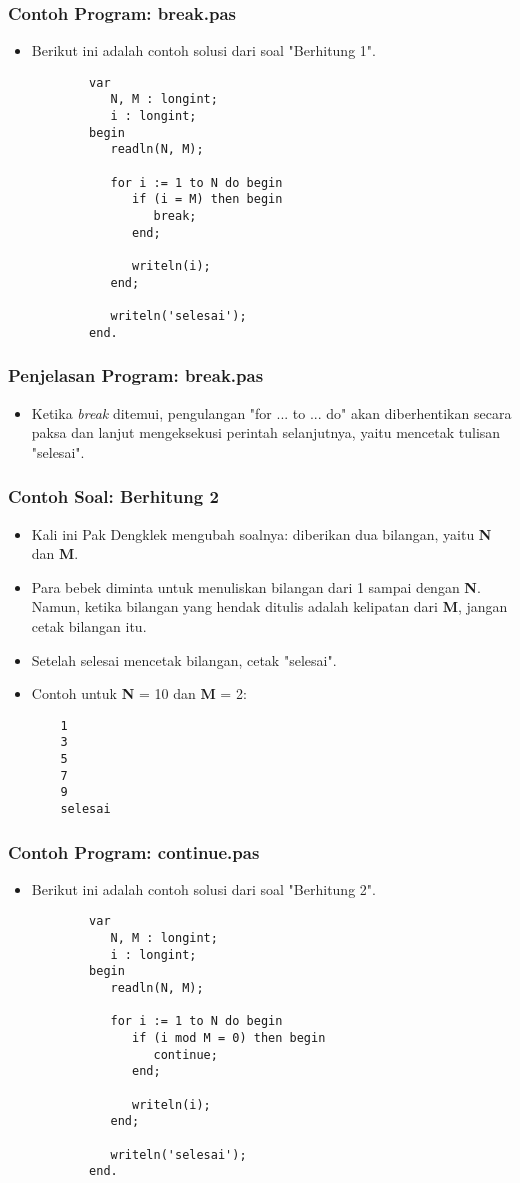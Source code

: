 \documentclass{beamer}
\begin{document}
\begin{frame}[fragile]
\frametitle{Contoh Program: break.pas}
\begin{itemize}
	\item Berikut ini adalah contoh solusi dari soal "Berhitung 1".
	\begin{lstlisting}
		var
		   N, M : longint;
		   i : longint;
		begin
		   readln(N, M);
		
		   for i := 1 to N do begin
		      if (i = M) then begin
		         break;
		      end;
		
		      writeln(i);
		   end;
		   
		   writeln('selesai');
		end.
	\end{lstlisting}
\end{itemize}
\end{frame}

\begin{frame}
\frametitle{Penjelasan Program: break.pas}
\begin{itemize}
	\item Ketika \textit{break} ditemui, pengulangan "for ... to ... do" akan diberhentikan secara paksa dan lanjut mengeksekusi perintah selanjutnya, yaitu mencetak tulisan "selesai".
\end{itemize}
\end{frame}

\begin{frame}[fragile]
\frametitle{Contoh Soal: Berhitung 2}
\begin{itemize}
	\item Kali ini Pak Dengklek mengubah soalnya: diberikan dua bilangan, yaitu \textbf{N} dan \textbf{M}.
	\item Para bebek diminta untuk menuliskan bilangan dari 1 sampai dengan \textbf{N}. Namun, ketika bilangan yang hendak ditulis adalah \alert{kelipatan} dari \textbf{M}, jangan cetak bilangan itu.
	\item Setelah selesai mencetak bilangan, cetak "selesai".
	\item Contoh untuk \textbf{N} = 10 dan \textbf{M} = 2:
	\begin{lstlisting}
	1
	3
	5
	7
	9
	selesai
	\end{lstlisting}
\end{itemize}
\end{frame}

\begin{frame}[fragile]
\frametitle{Contoh Program: continue.pas}
\begin{itemize}
	\item Berikut ini adalah contoh solusi dari soal "Berhitung 2".
	\begin{lstlisting}
		var
		   N, M : longint;
		   i : longint;
		begin
		   readln(N, M);
		
		   for i := 1 to N do begin
		      if (i mod M = 0) then begin
		         continue;
		      end;
		
		      writeln(i);
		   end;
		   
		   writeln('selesai');
		end.
	\end{lstlisting}
\end{itemize}
\end{frame}
\end{document}
